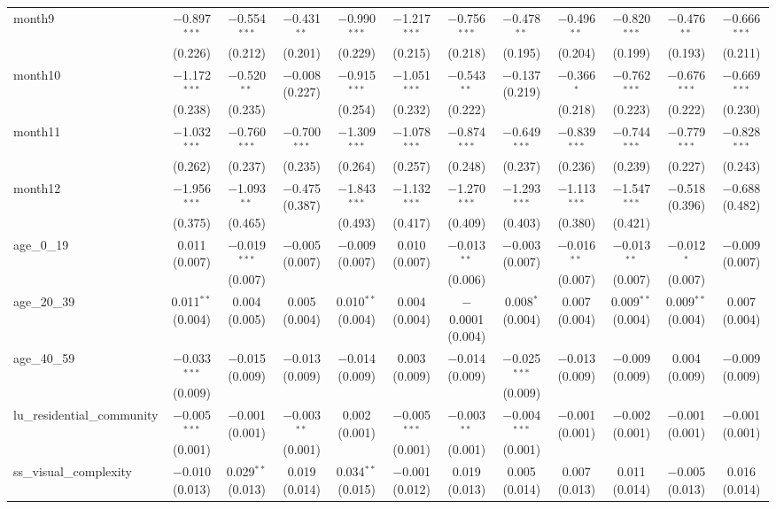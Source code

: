 \begin{table}[!htbp]
\begin{tabular}{@{\extracolsep{1pt}}lccccccccccc}
  month9 & $-$0.897$^{***}$ (0.226) & $-$0.554$^{***}$ (0.212) & $-$0.431$^{**}$ (0.201) & $-$0.990$^{***}$ (0.229) & $-$1.217$^{***}$ (0.215) & $-$0.756$^{***}$ (0.218) & $-$0.478$^{**}$ (0.195) & $-$0.496$^{**}$ (0.204) & $-$0.820$^{***}$ (0.199) & $-$0.476$^{**}$ (0.193) & $-$0.666$^{***}$ (0.211) \\ 
  month10 & $-$1.172$^{***}$ (0.238) & $-$0.520$^{**}$ (0.235) & $-$0.008 (0.227) & $-$0.915$^{***}$ (0.254) & $-$1.051$^{***}$ (0.232) & $-$0.543$^{**}$ (0.222) & $-$0.137 (0.219) & $-$0.366$^{*}$ (0.218) & $-$0.762$^{***}$ (0.223) & $-$0.676$^{***}$ (0.222) & $-$0.669$^{***}$ (0.230) \\ 
  month11 & $-$1.032$^{***}$ (0.262) & $-$0.760$^{***}$ (0.237) & $-$0.700$^{***}$ (0.235) & $-$1.309$^{***}$ (0.264) & $-$1.078$^{***}$ (0.257) & $-$0.874$^{***}$ (0.248) & $-$0.649$^{***}$ (0.237) & $-$0.839$^{***}$ (0.236) & $-$0.744$^{***}$ (0.239) & $-$0.779$^{***}$ (0.227) & $-$0.828$^{***}$ (0.243) \\ 
  month12 & $-$1.956$^{***}$ (0.375) & $-$1.093$^{**}$ (0.465) & $-$0.475 (0.387) & $-$1.843$^{***}$ (0.493) & $-$1.132$^{***}$ (0.417) & $-$1.270$^{***}$ (0.409) & $-$1.293$^{***}$ (0.403) & $-$1.113$^{***}$ (0.380) & $-$1.547$^{***}$ (0.421) & $-$0.518 (0.396) & $-$0.688 (0.482) \\ 
  age\_0\_19 & 0.011 (0.007) & $-$0.019$^{***}$ (0.007) & $-$0.005 (0.007) & $-$0.009 (0.007) & 0.010 (0.007) & $-$0.013$^{**}$ (0.006) & $-$0.003 (0.007) & $-$0.016$^{**}$ (0.007) & $-$0.013$^{**}$ (0.007) & $-$0.012$^{*}$ (0.007) & $-$0.009 (0.007) \\ 
  age\_20\_39 & 0.011$^{**}$ (0.004) & 0.004 (0.005) & 0.005 (0.004) & 0.010$^{**}$ (0.004) & 0.004 (0.004) & $-$0.0001 (0.004) & 0.008$^{*}$ (0.004) & 0.007 (0.004) & 0.009$^{**}$ (0.004) & 0.009$^{**}$ (0.004) & 0.007 (0.004) \\ 
  age\_40\_59 & $-$0.033$^{***}$ (0.009) & $-$0.015 (0.009) & $-$0.013 (0.009) & $-$0.014 (0.009) & 0.003 (0.009) & $-$0.014 (0.009) & $-$0.025$^{***}$ (0.009) & $-$0.013 (0.009) & $-$0.009 (0.009) & 0.004 (0.009) & $-$0.009 (0.009) \\ 
  lu\_residential\_community & $-$0.005$^{***}$ (0.001) & $-$0.001 (0.001) & $-$0.003$^{**}$ (0.001) & 0.002 (0.001) & $-$0.005$^{***}$ (0.001) & $-$0.003$^{**}$ (0.001) & $-$0.004$^{***}$ (0.001) & $-$0.001 (0.001) & $-$0.002 (0.001) & $-$0.001 (0.001) & $-$0.001 (0.001) \\ 
  ss\_visual\_complexity & $-$0.010 (0.013) & 0.029$^{**}$ (0.013) & 0.019 (0.014) & 0.034$^{**}$ (0.015) & $-$0.001 (0.012) & 0.019 (0.013) & 0.005 (0.014) & 0.007 (0.013) & 0.011 (0.014) & $-$0.005 (0.013) & 0.016 (0.014) \\ 

\end{tabular}
\end{table}
